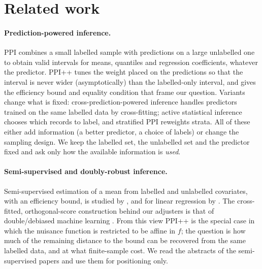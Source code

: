 \section{Related work}
\label{sec:related}

\paragraph{Prediction-powered inference.}
PPI \citep{angelopoulos2023ppi} combines a small labelled sample with predictions on a large unlabelled one to
obtain valid intervals for means, quantiles and regression coefficients, whatever the predictor. PPI++
\citep{angelopoulos2023ppiplus} tunes the weight placed on the predictions so that the interval is never wider
(asymptotically) than the labelled-only interval, and gives the efficiency bound and equality condition that
frame our question. Variants change what is fixed: cross-prediction-powered inference
\citep{zrnic2023cross} handles predictors trained on the same labelled data by cross-fitting; active statistical
inference \citep{zrnic2024active} chooses which records to label, and stratified PPI \citep{fisch2024stratified}
reweights strata. All of these either add information (a better predictor, a choice of labels) or change the
sampling design. We keep the labelled set, the unlabelled set and the predictor fixed and ask only how
the available information is \emph{used}.

\paragraph{Semi-supervised and doubly-robust inference.}
Semi-supervised estimation of a mean from labelled and unlabelled covariates, with an efficiency bound,
is studied by \citet{zhang2019semisup}, and for linear regression by \citet{chakrabortty2018efficient}.
The cross-fitted, orthogonal-score construction behind our adjusters is that of double/debiased machine learning
\citep{chernozhukov2018dml}. From this view PPI++ is the special case in which the nuisance function is restricted
to be affine in $f$; the question is how much of the remaining distance to the bound can be recovered from the same labelled data,
and at what finite-sample cost. We read the abstracts of the semi-supervised papers and use them for positioning only.
